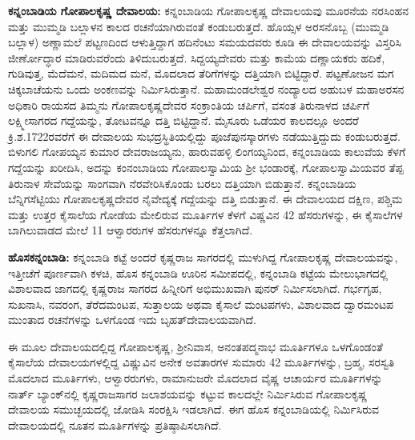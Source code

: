 \textbf{ಕನ್ನಂಬಾಡಿಯ ಗೋಪಾಲಕೃಷ್ಣ ದೇವಾಲಯ: } ಕನ್ನಂಬಾಡಿಯ ಗೋಪಾಲಕೃಷ್ಣ ದೇವಾಲಯವು ಮೂರನೆಯ ನರಸಿಂಹನ ಮತ್ತು ಮುಮ್ಮಡಿ ಬಲ್ಲಾಳನ ಕಾಲದ ರಚನೆಯಾಗಿರುವಂತೆ ಕಂಡುಬರುತ್ತದೆ. ಹೊಯ್ಸಳ ಅರಸನೊಬ್ಬ (ಮುಮ್ಮಡಿ ಬಲ್ಲಾಳ) ಅಣ್ಣಾಮಲೆ ಪಟ್ಟಣದಿಂದ ಆಳುತ್ತಿದ್ದಾಗ ಹದಿನೆಂಟು ಸಮಯದವರು ಕೂಡಿ ಈ ದೇವಾಲಯವನ್ನು ವಿಸ್ತರಿಸಿ ಜೀರ್ಣೋದ್ಧಾರ ಮಾಡಿರುವರೆಂದು ತಿಳಿದುಬರುತ್ತದೆ. ಸಿದ್ದಯ್ಯದೇವರು ಮತ್ತು ಕಾಮೆಯ ದಣ್ಣಾಯಕರು ಹದಿಕೆ, ಗುಡಿವುತ್ತ, ಮೆದೆಮನೆ, ಮದಿಮದ ಮನೆ, ಮೊದಲಾದ ತೆರಿಗೆಗಳನ್ನು ದತ್ತಿಯಾಗಿ ಬಿಟ್ಟಿದ್ದಾರೆ. ಪಟ್ಟಣೋಜನ ಮಗ ಚಿಕ್ಕಬಾಚೆಯನು ಒಂದು ಅಂಕಣವನ್ನು ನಿರ್ಮಿಸಿರುತ್ತಾನೆ. ಮಹಾಮಂಡಲೇಶ್ವರ ನಂದ್ಯಾಲದ ಅಹುಬಳ ಮಹಾಅರಸನ ಅಧಿಕಾರಿ ರಾಯಸದ ತಿಮ್ಮನು ಗೋಪಾಲಕೃಷ್ಣದೇವರ ಸಂಕ್ರಾಂತಿಯ ಚರ್ಪಿಗೆ, ವಸಂತ ತಿರುನಾಳದ ಚರ್ಪಿಗೆ ಲಕ್ಷ್ಮೀಸಾಗರದ ಗದ್ದೆಯನ್ನು, ತೋಟವನ್ನೂ ದತ್ತಿ ಬಿಟ್ಟಿದ್ದಾನೆ. ಮೈಸೂರು ಒಡೆಯರ ಕಾಲದಲ್ಲೂ ಅಂದರೆ ಕ್ರಿ.ಶ.1722ರವರೆಗೆ ಈ ದೇವಾಲಯ ಸುಭದ್ರಸ್ಥಿತಿಯಲ್ಲಿದ್ದು ಪೂಜೆಪುನಸ್ಕಾರಗಳು ನಡೆಯುತ್ತಿದ್ದುದು ಕಂಡುಬರುತ್ತದೆ. ಬಿಳುಗಲಿ ಗೋಪಯ್ಯನ ಕುಮಾರ ದೇವರಾಜಯ್ಯನು, ಹಾರುವಹಳ್ಳಿ ಲಿಂಗಯ್ಯನಿಂದ, ಕನ್ನಂಬಾಡಿಯ ಕಾಲುವೆಯ ಕೆಳಗೆ ಗದ್ದೆಯನ್ನು ಖರೀದಿಸಿ, ಅದನ್ನು ಕಂನಂಬಾಡಿಯ ಗೋಪಾಲಸ್ವಾಮಿಯ ಶ‍್ರೀ ಭಂಡಾರಕ್ಕೆ, ಗೋಪಾಲಸ್ವಾಮಿಯವರ ತೆಪ್ಪ ತಿರುನಾಳ ಸೇವೆಯನ್ನು ಸಾಂಗವಾಗಿ ನೆರವೇರಿಸಿಕೊಂಡು ಬರಲು ದತ್ತಿಯಾಗಿ ಬಿಡುತ್ತಾನೆ. ಕನ್ನಂಬಾಡಿಯ ಬೆನ್ನಿಗಸೆಟ್ಟಿಯು ಗೋಪಾಲಕೃಷ್ಣದೇವರ ನೈವೇದ್ಯಕ್ಕೆ ಗದ್ದೆಯನ್ನು ದತ್ತಿ ಬಿಡುತ್ತಾನೆ. ಈ ದೇವಾಲಯದ ದಕ್ಷಿಣ, ಪಶ್ಚಿಮ ಮತ್ತು ಉತ್ತರ ಕೈಸಾಲೆಯ ಗೋಡೆಯ ಮೇಲಿರುವ ಮೂರ್ತಿಗಳ ಕೆಳಗೆ ವಿಷ್ಣವಿನ 42 ಹೆಸರುಗಳನ್ನು, ಈ ಕೈಸಾಲೆಗಳ ಬಾಗಿಲುವಾಡದ ಮೇಲೆ 11 ಆಳ್ವಾರರುಗಳ ಹೆಸರುಗಳನ್ನೂ ಕೆತ್ತಲಾಗಿದೆ.

\textbf{ಹೊಸಕನ್ನಂಬಾಡಿ:} ಕನ್ನಂಬಾಡಿ ಕಟ್ಟೆ ಅಂದರೆ ಕೃಷ್ಣರಾಜ ಸಾಗರದಲ್ಲಿ ಮುಳುಗಿದ್ದ ಗೋಪಾಲಕೃಷ್ಣ ದೇವಾಲಯವನ್ನು, ಇತ್ತೀಚೆಗೆ ಪೂರ್ಣವಾಗಿ ಕಳಚಿ, ಹೊಸ ಕನ್ನಂಬಾಡಿ ಊರಿನ ಸಮೀಪದಲ್ಲಿ, ಕನ್ನಂಬಾಡಿ ಕಟ್ಟೆಯ ಮೇಲುಭಾಗದಲ್ಲಿ ವಿಶಾಲವಾದ ಜಾಗದಲ್ಲಿ ಕೃಷ್ಣರಾಜ ಸಾಗರದ ಹಿನ್ನೀರಿಗೆ ಅಭಿಮುಖವಾಗಿ ಪುನರ್​ ನಿರ್ಮಿಸಲಾಗಿದೆ. ಗರ್ಭಗೃಹ, ಸುಖನಾಸಿ, ನವರಂಗ, ತೆರೆದಮಂಟಪ, ಸುತ್ತಾಲಯ ಅಥವಾ ಕೈಸಾಲೆ ಮಂಟಪಗಳು, ವಿಶಾಲವಾದ ದ್ವಾರಮಂಟಪ ಮುಂತಾದ ರಚನೆಗಳನ್ನು ಒಳಗೊಂಡ ಇದು ಬೃಹತ್​ ದೇವಾಲಯವಾಗಿದೆ.

ಈ ಮೂಲ ದೇವಾಲಯದಲ್ಲಿದ್ದ ಗೋಪಾಲಕೃಷ್ಣ, ಶ‍್ರೀನಿವಾಸ, ಅನಂತಪದ್ಮನಾಭ ಮೂರ್ತಿಗಳೂ ಒಳಗೊಂಡಂತೆ ಕೈಸಾಲೆಯ ದೇವಾಲಯಗಳಲ್ಲಿದ್ದ ವಿಷ್ಣುವಿನ ಅನೇಕ ಅವತಾರಗಳ ಸುಮಾರು 42 ಮೂರ್ತಿಗಳನ್ನು, ಬ್ರಹ್ಮ, ಸರಸ್ವತಿ ಮೊದಲಾದ ಮೂರ್ತಿಗಳು, ಆಳ್ವಾರರುಗಳು, ರಾಮಾನುಜರೇ ಮೊದಲಾದ ವೈಷ್ಣ ಆಚಾರ್ಯರ ಮೂರ್ತಿಗಳನ್ನು ನಾರ್ತ್ ಬ್ಯಾಂಕ್​ನಲ್ಲಿ ಕೃಷ್ಣರಾಜಸಾಗರ ಜಲಾಶಯವನ್ನು ಕಟ್ಟುವ ಕಾಲದಲ್ಲೇ ನಿರ್ಮಿಸಿರುವ ಗೋಪಾಲಕೃಷ್ಣ ದೇವಾಲಯ ಸಮುಚ್ಛಯದಲ್ಲಿ ಜೋಡಿಸಿ ಸಂರಕ್ಷಿಸಿ ಇಡಲಾಗಿದೆ. ಈಗ ಹೊಸ ಕನ್ನಂಬಾಡಿಯಲ್ಲಿ ನಿರ್ಮಿಸಿರುವ ದೇವಾಲಯದಲ್ಲಿ ನೂತನ ಮೂರ್ತಿಗಳನ್ನು ಪ್ರತಿಷ್ಠಾಪಿಸಲಾಗಿದೆ. 

